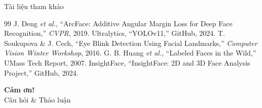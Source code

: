 \documentclass[aspectratio=169]{beamer}
\begin{document}
\begin{frame}{Tài liệu tham khảo}
  \footnotesize
  \begin{thebibliography}{99}
     J. Deng \textit{et al.}, ``ArcFace: Additive Angular Margin Loss for Deep Face Recognition,'' \textit{CVPR}, 2019.
     Ultralytics, ``YOLOv11,'' GitHub, 2024.
     T. Soukupova \& J. Cech, ``Eye Blink Detection Using Facial Landmarks,'' \textit{Computer Vision Winter Workshop}, 2016.
     G. B. Huang \textit{et al.}, ``Labeled Faces in the Wild,'' UMass Tech Report, 2007.
     InsightFace, ``InsightFace: 2D and 3D Face Analysis Project,'' GitHub, 2024.
  \end{thebibliography}
\end{frame}

\begin{frame}[plain]
  \begin{center}
    \vspace{2.5cm}
    {\Huge \textbf{Cảm ơn!}}\\[0.8em]
    {\Large Câu hỏi \& Thảo luận}
  \end{center}
\end{frame}
\end{document}
